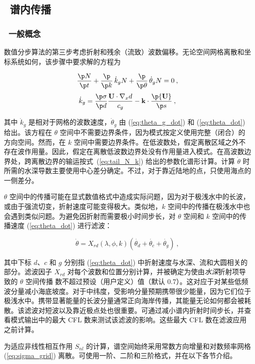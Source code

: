 \vssub
\subsection{~谱内传播} \label{sub:spec}
\vssub
\subsubsection{~一般概念}
\vsssub

数值分步算法的第三步考虑折射和残余（流致）波数偏移。无论空间网格离散和坐标系统如何，该步骤中要求解的方程为


\begin{equation}
\frac{\p N}{\p t} + \frac{\p}{\p k} \, \dot{k}_g N +
\frac{\p}{\p \theta} \, \dot{\theta}_g N = 0
\: , \label{eq:step_intra} \end{equation} \begin{equation}
\dot{k}_g  = \frac{\p \sigma}{\p d} 
    \frac{{\bf U} \cdot \nabla_x d}{c_g}  -
    {\bf k} \cdot \frac{\p {\bf U}}{\p s}
\: , \label{eq:k_dot_g} \end{equation}

\noindent
其中 $\dot{k}_g$ 是相对于网格的波数速度，$\dot{\theta}_g$ 由 (\ref{eq:theta_g_dot}) 和 (\ref{eq:theta_dot}) 给出。该方程在 $\theta$ 空间中不需要边界条件，因为模式按定义使用完整（闭合）的方向空间。然而，在 $k$ 空间中需要边界条件。在低波数处，假定离散区域之外不存在波作用量。因此，假定在离散低波数边界处没有作用量进入模式。在高波数边界处，跨离散边界的输运按式~(\ref{eq:tail_N_k}) 给出的参数化谱形计算。计算 $\dot{\theta}$ 时所需的水深导数主要使用中心差分确定。不过，对于靠近陆地的点，只使用海点的一侧差分。

$\theta$ 空间中的传播可能在显式数值格式中造成实际问题，因为对于极浅水中的长波，或由于强流切变，折射速度可能变得极大。类似地，$k$ 空间中的传播在极浅水中也会遇到类似问题。为避免因折射而需要极小时间步长，对 $\theta$ 空间和 $k$ 空间中的传播速度 (\ref{eq:theta_dot}) 进行滤波：


\begin{equation}
\dot{\theta} = X_{rd}(\lambda,\phi,k)\left( \dot{\theta_d} + 
\dot{\theta_c} + \dot{\theta_g} \right)\: , \label{eq:theta_filter} \end{equation}

\noindent
其中下标 $d$、$c$ 和 $g$ 分别指 (\ref{eq:theta_dot}) 中折射速度与水深、流和大圆相关的部分。滤波因子 $X_{rd}$ 对每个波数和位置分别计算，并被确定为使由\emph{水深}折射项导致的 $\theta$ 空间传播 \cfl{} 数不超过预设（用户定义）值（默认 0.7）。这对应于对某些低频波分量减小海底坡度。对于中纬度，受影响分量预期携带很少能量，因为它们位于极浅水中。携带显著能量的长波分量通常正向海岸传播，其能量无论如何都会被耗散。该滤波对短波以及靠近极点处也很重要。可通过减小谱内折射时间步长，并查看模式输出中的最大 CFL 数来测试该滤波的影响。这些最大 CFL 数在滤波应用之前计算。



为适应非线性相互作用 $S_{nl}$ 的计算，谱空间始终采用常数方向增量和对数频率网格 (\ref{eq:sigma_grid}) 离散。可使用一阶、二阶和三阶格式，并在以下各节介绍。
